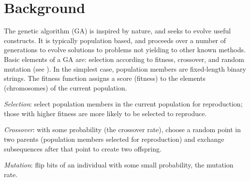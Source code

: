 \section{Background}
The genetic algorithm (GA) is inspired by nature, and seeks to evolve useful constructs. It is typically population based, and 
proceeds over a number of generations to evolve solutions to problems not yielding to other known methods. 
Basic elements of a GA are: 
selection according to fitness, crossover, and random mutation (see \cite{Mitchell1999}). 
In the simplest case, population members are fixed-length binary strings.   
The fitness function assigns a score (fitness) to the elements (chromosomes) of 
the current population. 

\textit{Selection}: select population members in the current population for reproduction; 
those with higher fitness are more likely to be selected to reproduce.

\textit{Crossover}: with some probability (the crossover rate), choose a random point in two parents (population members selected for reproduction) 
and exchange subsequences after that point to create two offspring.

\textit{Mutation}: flip bits of an individual with some small probability, 
the mutation rate.


